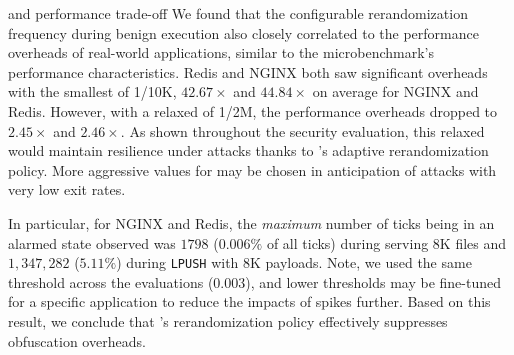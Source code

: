   and performance trade-off
We found that the configurable rerandomization frequency during benign execution  also closely correlated to the performance overheads of real-world applications, similar to the microbenchmark's performance characteristics.
Redis and NGINX both saw significant overheads with the smallest  of 1/10K, $42.67\times$ and $44.84\times$ on average for NGINX and Redis.
However, with a relaxed  of 1/2M, the performance overheads dropped to $2.45\times$ and $2.46\times$.
As shown throughout the security evaluation, this relaxed  would maintain resilience under attacks thanks to \thename's adaptive rerandomization policy.
More aggressive values for  may be chosen in anticipation of attacks with very low exit rates.

In particular, for NGINX and Redis, the \emph{maximum} number of ticks being in an alarmed state observed was $1798$ ($0.006\%$ of all ticks) during serving 8K files and  $1,347,282$ ($5.11\%$) during \texttt{LPUSH} with 8K payloads.
Note, we used the same  threshold across the evaluations ($0.003$), and lower thresholds may be fine-tuned for a specific application to reduce the impacts of spikes further.
Based on this result, we conclude that \thename's rerandomization policy effectively suppresses obfuscation overheads.

